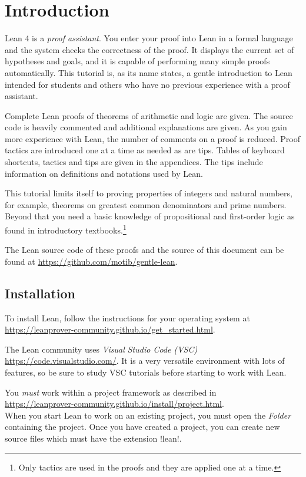 
\section{Introduction}

Lean 4 is a \emph{proof assistant}. You enter your proof into Lean in a formal language and the system checks the correctness of the proof. It displays the current set of hypotheses and goals, and it is capable of performing many simple proofs automatically. This tutorial is, as its name states, a gentle introduction to Lean intended for students and others who have no previous experience with a proof assistant.

Complete Lean proofs of theorems of arithmetic and logic are given. The source code is heavily commented and additional explanations are given. As you gain more experience with Lean, the number of comments on a proof is reduced. Proof tactics are introduced one at a time as needed as are tips. Tables of keyboard shortcuts, tactics and tips are given in the appendices. The tips include information on definitions and notations used by Lean.

This tutorial limits itself to proving properties of integers and natural numbers, for example, theorems on greatest common denominators and prime numbers. Beyond that you need a basic knowledge of propositional and first-order logic as found in introductory textbooks.\footnote{Only tactics are used in the proofs and they are applied one at a time.}

The Lean source code of these proofs and the \XeLaTeX{} source of this document can be found at
\indnt{}\url{https://github.com/motib/gentle-lean}.

\subsection*{Installation}

To install Lean, follow the instructions for your operating system at\\
\indnt\url{https://leanprover-community.github.io/get_started.html}.

The Lean community uses \emph{Visual Studio Code (VSC)} \url{https://code.visualstudio.com/}. It is a very versatile environment with lots of features, so be sure to study VSC tutorials before starting to work with Lean.

You \emph{must} work within a project framework as described in\\ \indnt\url{https://leanprover-community.github.io/install/project.html}.\\ When you start Lean to work on an existing project, you must open the \emph{Folder} containing the project. Once you have created a project, you can create new source files which must have the extension !lean!.

